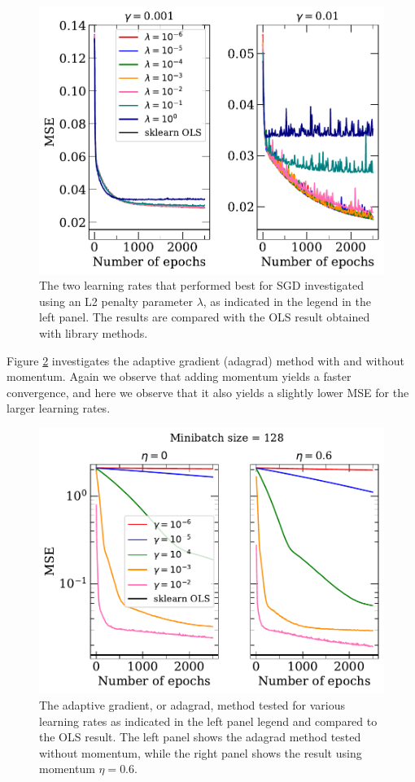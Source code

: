 \documentclass[a4paper,
amsfonts,
amssymb,
amsmath,
reprint,
showkeys,
nofootinbib,
twoside]{revtex4-2}
\begin{document}
\begin{figure} [h]
    \centering
    \includegraphics[width = \columnwidth]{Figures/sgd_ridge_1.pdf}
    \caption{The two learning rates that performed best for SGD investigated using an L2 penalty parameter $\lambda$, as indicated in the legend in the left panel. The results are compared with the OLS result obtained with library methods. }
    \label{fig:sgd_ridge}
\end{figure}



Figure \ref{fig:adagrad} investigates the adaptive gradient (adagrad) method with and without momentum. Again we observe that adding momentum yields a faster convergence, and here we observe that it also yields a slightly lower MSE for the larger learning rates.


\begin{figure}
    \centering
    \includegraphics[width = \columnwidth]{Figures/adagrad_1.pdf}
    \caption{The adaptive gradient, or adagrad, method tested for various learning rates as indicated in the left panel legend and compared to the OLS result. The left panel shows the adagrad method tested without momentum, while the right panel shows the result using momentum $\eta = 0.6$.}
    \label{fig:adagrad}
\end{figure}
\end{document}
